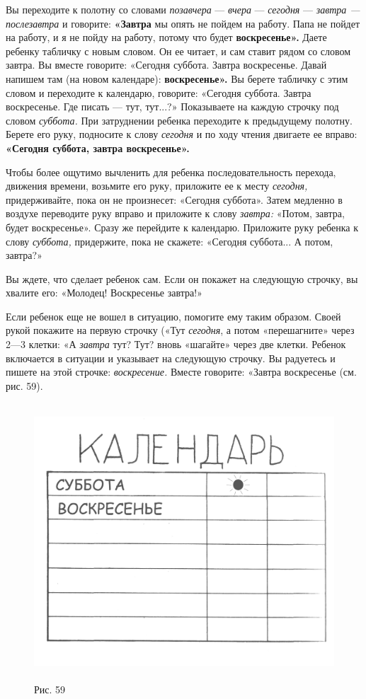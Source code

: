 \documentclass[a5paper]{book}
\renewcommand{\emph}[1]{\textit{#1}}
\begin{document}
Вы переходите к полотну со словами \emph{позавчера} --- \emph{вчера} ---
\emph{сегодня} --- \emph{завтра --- послезавтра} и говорите:
\textbf{«Завтра} мы опять не пойдем на работу. Папа не пойдет на работу,
и я не пойду на работу, потому что будет \textbf{воскресенье».} Даете
ребенку табличку с новым словом. Он ее читает, и сам ставит рядом со
словом завтра. Вы вместе говорите: «Сегодня суббота. Завтра воскресенье.
Давай напишем там (на новом календаре): \textbf{воскресенье».} Вы берете
табличку с этим словом и переходите к календарю, говорите: «Сегодня
суббота. Завтра воскресенье. Где писать --- тут, тут...?» Показываете на
каждую строчку под словом \emph{суббота.} При затруднении ребенка
переходите к предыдущему полотну. Берете его руку, подносите к слову
\emph{сегодня} и по ходу чтения двигаете ее вправо: \textbf{«Сегодня
суббота, завтра воскресенье».}

Чтобы более ощутимо вычленить для ребенка последовательность перехода,
движения времени, возьмите его руку, приложите ее к месту
\emph{сегодня,} придерживайте, пока он не произнесет: «Сегодня суббота».
Затем медленно в воздухе переводите руку вправо и приложите к слову
\emph{завтра:} «Потом, завтра, будет воскресенье». Сразу же перейдите к
календарю. Приложите руку ребенка к слову \emph{суббота,} придержите,
пока не скажете: «Сегодня суббота... А потом, завтра?»

Вы ждете, что сделает ребенок сам. Если он покажет на следующую строчку,
вы хвалите его: «Молодец! Воскресенье завтра!»

Если ребенок еще не вошел в ситуацию, помогите ему таким образом. Своей
рукой покажите на первую строчку («Тут \emph{сегодня}, а потом
«перешагните» через 2---3 клетки: «А \emph{завтра} тут? Тут? вновь
«шагайте» через две клетки. Ребенок включается в ситуации и указывает на
следующую строчку. Вы радуетесь и пишете на этой строчке:
\emph{воскресение.} Вместе говорите: «Завтра воскресенье (см. рис. 59).


\begin{figure}
\centering
\includegraphics[width=4.9029in,height=4.07083in]{media/media/image56.jpg}
\caption*{Рис. 59}
\end{figure}
\end{document}
